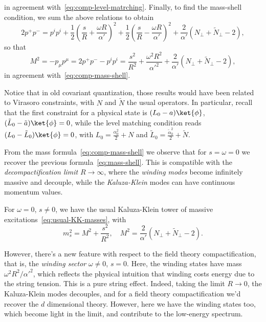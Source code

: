\begin{mdframed}
\begin{innerproof}
\begin{equation*}
    \end{equation*}
    in agreement with~\eqref{eq:comp-level-matrching}. Finally, to find the mass-shell condition, we sum the above relations to obtain
    \begin{equation*}
        2p^+p^- = p^i p^i + \frac{1}{2} \left( \frac{s}{R} + \frac{\omega R}{\alpha'} \right)^2 + \frac{1}{2} \left( \frac{s}{R} - \frac{\omega R}{\alpha'} \right)^2 + \frac{2}{\alpha'} (N_\perp + \tilde{N}_\perp - 2),
    \end{equation*}
    so that
    \begin{equation}
        M^2 = -p_\mu p^\mu = 2 p^+ p^- - p^i p^i = \frac{s^2}{R^2} + \frac{\omega^2 R^2}{\alpha'^2} + \frac{2}{\alpha'} (N_\perp + \tilde{N}_\perp - 2),
    \end{equation}
    in agreement with~\eqref{eq:comp-mass-shell}.

    Notice that in old covariant quantization, those results would have been related to Virasoro constraints, with $N$ and $\tilde{N}$ the usual operators. In particular, recall that the first constraint for a physical state is $(L_0 -a) \ket{\phi}$, $(\tilde{L}_0 - \tilde{a}) \ket{\phi} = 0$, while the level matching condition reads $(L_0 - \tilde{L}_0) \ket{\phi} = 0$, with $L_0 = \frac{\alpha^2_0}{2} + N$ and $\tilde{L}_0 = \frac{\tilde{\alpha}^2_0}{2} + \tilde{N}$.
\end{innerproof}
\end{mdframed}

From the mass formula~\eqref{eq:comp-mass-shell} we observe that for $s = \omega = 0$ we recover the previous formula~\eqref{eq:mass-shell}. This is compatible with the \emph{decompactification limit} $R \to \infty$, where the \emph{winding modes} become infinitely massive and decouple, while the \emph{Kaluza-Klein} modes can have continuous momentum values. 

For $\omega = 0$, $s\neq 0$, we have the usual Kaluza-Klein tower of massive excitations~\eqref{eq:usual-KK-masses}, with
\begin{equation}
    m_s^2 = M^2 + \frac{s^2}{R^2}, \quad M^2 = \frac{2}{\alpha'} (N_\perp + \tilde{N}_\perp - 2) .
\end{equation}

However, there's a new feature with respect to the field theory compactification, that is, the \emph{winding sector} $\omega \neq 0$, $s = 0$. Here, the winding states have mass ${\omega^2 R^2}/{\alpha'^2}$, which reflects the physical intuition that winding costs energy due to the string tension. This is a pure string effect. Indeed, taking the limit $R \to 0$, the Kaluza-Klein modes decouples, and for a field theory compactification we'd recover the $d$ dimensional theory. However, here we have the winding states too, which become light in the limit, and contribute to the low-energy spectrum.

